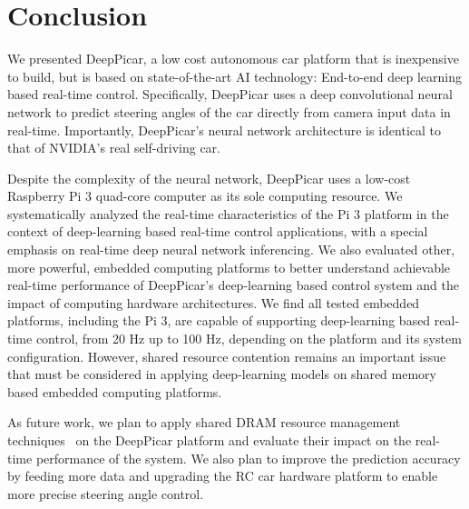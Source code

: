 \section{Conclusion}\label{sec:conclusion}
We presented DeepPicar, a low cost autonomous car platform that is
inexpensive to build, but is based on state-of-the-art AI technology:
End-to-end deep learning based real-time control.
Specifically, DeepPicar uses a deep convolutional neural network to
predict steering angles of the car directly from camera input data
in real-time. Importantly, DeepPicar's neural network architecture is
identical to that of NVIDIA's real self-driving car. 

Despite the complexity of the neural network, DeepPicar uses a
low-cost Raspberry Pi 3 quad-core computer as its sole computing
resource. We systematically analyzed the real-time characteristics of
the Pi 3 platform in the context of deep-learning based real-time
control applications, with a special emphasis on real-time deep neural
network inferencing.
We also evaluated other, more powerful, embedded computing
platforms to better understand achievable real-time performance of
DeepPicar's deep-learning based control system and the impact of
computing hardware architectures.
We find all tested embedded platforms, including the Pi 3, are capable
of supporting deep-learning based real-time control, from 20 Hz up to
100 Hz, depending on the platform and its system
configuration. However, shared resource contention remains an
important issue that must be considered in applying deep-learning
models on shared memory based embedded computing platforms.

As future work, we plan to apply shared DRAM resource management
techniques~\cite{Yun2013,yun2014rtas} on the DeepPicar platform and
evaluate their impact on the real-time performance of the system. We
also plan to improve the prediction accuracy by feeding more data and
upgrading the RC car hardware platform to enable more precise steering
angle control.